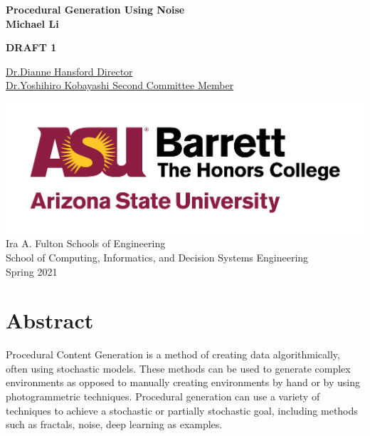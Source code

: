 \documentclass[12pt]{article}
\begin{document}
	\begin{titlepage}
		\begin{center}
			\Large
			\textbf{Procedural Generation Using Noise}\\
			
			\vspace{1.5cm}
			\normalsize
			\textbf{Michael Li}\\
			
			\vfill
			
			\textbf{DRAFT 1}
			
			\uline{Dr.Dianne Hansford \hfill Director}\\
			\vspace{1.5cm}
			\uline{Dr.Yoshihiro Kobayashi \hfill Second Committee Member}\\
			
			\vspace{3cm}
			
			\includegraphics[scale=.5]{asu_barretthonors_horiz_rgb_maroongold_600ppi}\\
			\vspace{1.5cm}
			Ira A. Fulton Schools of Engineering \\
			School of Computing, Informatics, and Decision Systems Engineering\\
			Spring 2021
		\end{center}
	\end{titlepage}
	
	\section*{Abstract}
	Procedural Content Generation is a method of creating data algorithmically, often using stochastic models. These methods can be used to generate complex environments as opposed to manually creating environments by hand or by using photogrammetric techniques. Procedural generation can use a variety of techniques to achieve a stochastic or partially stochastic goal, including methods such as fractals,  noise, deep learning as examples. \\
	\clearpage
	
\end{document}
